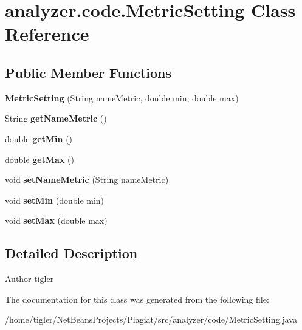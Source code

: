 \hypertarget{classanalyzer_1_1code_1_1MetricSetting}{}\section{analyzer.\+code.\+Metric\+Setting Class Reference}
\label{classanalyzer_1_1code_1_1MetricSetting}
\subsection*{Public Member Functions}
\begin{DoxyCompactItemize}
\item 
\mbox{\label{classanalyzer_1_1code_1_1MetricSetting_a3d0ddc8a14d995bf74f1d0911071d433}} 
{\bfseries Metric\+Setting} (String name\+Metric, double min, double max)
\item 
\mbox{\label{classanalyzer_1_1code_1_1MetricSetting_a47ab40bf519dd6f0ac01d22637f37fd6}} 
String {\bfseries get\+Name\+Metric} ()
\item 
\mbox{\label{classanalyzer_1_1code_1_1MetricSetting_ac3bd69cf9abd575fa3c457b3076a0279}} 
double {\bfseries get\+Min} ()
\item 
\mbox{\label{classanalyzer_1_1code_1_1MetricSetting_a1b8e3d27c760d4ab665ce757e2d0992d}} 
double {\bfseries get\+Max} ()
\item 
\mbox{\label{classanalyzer_1_1code_1_1MetricSetting_ad60c19d21233c834dffa2cdd4470b198}} 
void {\bfseries set\+Name\+Metric} (String name\+Metric)
\item 
\mbox{\label{classanalyzer_1_1code_1_1MetricSetting_ad38e9bae0dc21c88b0343f968de255fd}} 
void {\bfseries set\+Min} (double min)
\item 
\mbox{\label{classanalyzer_1_1code_1_1MetricSetting_a2b3347cd21f8f8f40b065befaa1081b4}} 
void {\bfseries set\+Max} (double max)
\end{DoxyCompactItemize}


\subsection{Detailed Description}
\begin{DoxyAuthor}{Author}
tigler 
\end{DoxyAuthor}


The documentation for this class was generated from the following file\+:\begin{DoxyCompactItemize}
\item 
/home/tigler/\+Net\+Beans\+Projects/\+Plagiat/src/analyzer/code/Metric\+Setting.\+java\end{DoxyCompactItemize}
